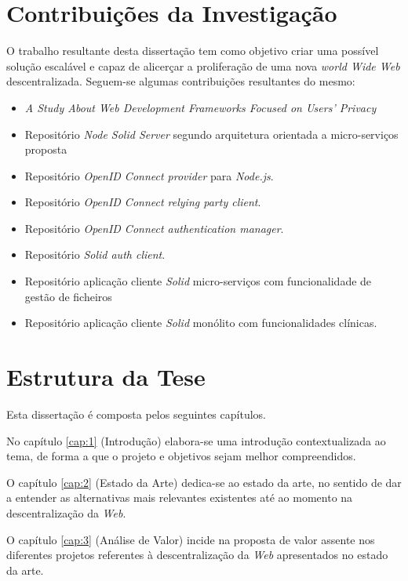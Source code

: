 \section{Contribuições da Investigação \label{section_contribuicoes_investigacao}}
O trabalho resultante desta dissertação tem como objetivo criar uma possível solução escalável e capaz de alicerçar a proliferação de uma nova \emph{world Wide Web} descentralizada. Seguem-se algumas contribuições resultantes do mesmo:
\begin{itemize}
    \item \emph{A Study About Web Development Frameworks Focused on Users’ Privacy}\cite{solid_article}
    \item Repositório \emph{Node Solid Server} segundo arquitetura orientada a micro-serviços proposta\cite{repo_node_solid_server}
    \item Repositório \emph{OpenID Connect provider} para \emph{Node.js}\cite{repo_oidc_op}.
    \item Repositório \emph{OpenID Connect relying party client}\cite{repo_oidc_rp}.
    \item Repositório \emph{OpenID Connect authentication manager}\cite{repo_oidc_auth_manager}.
    \item Repositório \emph{Solid auth client}\cite{repo_solid_auth_client}.
    \item Repositório aplicação cliente \emph{Solid} micro-serviços com funcionalidade de gestão de ficheiros\cite{repo_solid_filemanager}
    \item Repositório aplicação cliente \emph{Solid} monólito com funcionalidades clínicas\cite{repo_steve_clinic}.
\end{itemize}

\section{Estrutura da Tese}

Esta dissertação é composta pelos seguintes capítulos.

No capítulo \ref{cap:1} (Introdução) elabora-se uma introdução contextualizada ao tema, de forma a que o projeto e objetivos sejam melhor compreendidos.

O capítulo \ref{cap:2} (Estado da Arte) dedica-se ao estado da arte, no sentido de dar a entender as alternativas mais relevantes existentes até ao momento na descentralização da \emph{Web}.

O capítulo \ref{cap:3} (Análise de Valor) incide na proposta de valor assente nos diferentes projetos referentes à descentralização da \emph{Web} apresentados no estado da arte.

